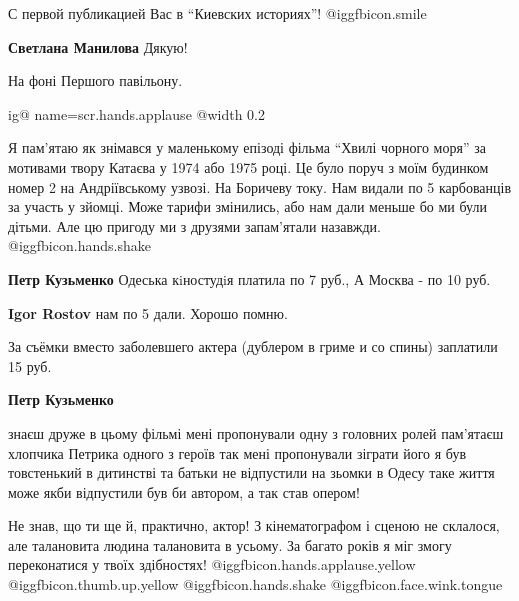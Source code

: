  
 
 
 
 
\zzSecCmt

\begin{itemize} %
С первой публикацией Вас в \enquote{Киевских историях}! @igg{fbicon.smile} 

\textbf{Светлана Манилова} Дякую!

На фоні Першого павільону.


\ifcmt
  ig@ name=scr.hands.applause
  @width 0.2
\fi


Я пам'ятаю як знімався у маленькому епізоді фільма \enquote{Хвилі чорного моря} за
мотивами твору Катаєва у 1974 або 1975 році. Це було поруч з моїм будинком
номер 2 на Андріївському узвозі. На Боричеву току. Нам видали по 5 карбованців
за участь у зйомці. Може тарифи змінились, або нам дали меньше бо ми були
дітьми. Але цю пригоду ми з друзями запам'ятали назавжди.  @igg{fbicon.hands.shake} 

\begin{itemize} %
\textbf{Петр Кузьменко} Одеська кiностудiя платила по 7 руб., А Москва - по 10 руб.

\textbf{Igor Rostov} нам по 5 дали. Хорошо помню.

За съёмки вместо заболевшего актера (дублером в гриме и со спины) заплатили 15 руб.

\textbf{Петр Кузьменко} 

знаєш друже в цьому фільмі мені пропонували одну з головних ролей пам'ятаєш
хлопчика Петрика одного з героїв так мені пропонували зіграти його я був
товстенький в дитинстві та батьки не відпустили на зьомки в Одесу таке життя
може якби відпустили був би автором, а так став опером!


Не знав, що ти ще й, практично, актор! З кінематографом і сценою не склалося,
але талановита людина талановита в усьому. За багато років я міг змогу
переконатися у твоїх здібностях!  @igg{fbicon.hands.applause.yellow}
@igg{fbicon.thumb.up.yellow}  @igg{fbicon.hands.shake}
@igg{fbicon.face.wink.tongue} 


\end{itemize}
\end{itemize}
